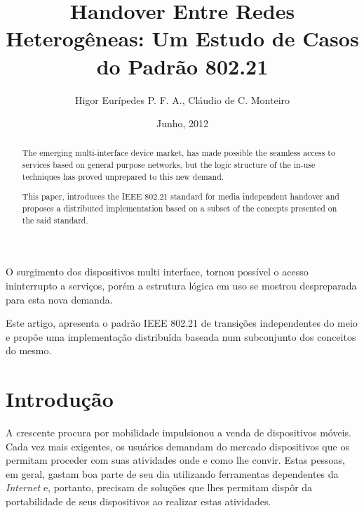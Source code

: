 \documentclass[12pt]{article}
\title{Handover Entre Redes Heterogêneas: Um Estudo de Casos do Padrão 
802.21}
\author{Higor Eurípedes P. F. A.\inst{1}, Cláudio de C. Monteiro\inst{1}}
\date{Junho, 2012}
\begin{document}


\maketitle

\begin{resumo}

O surgimento dos dispositivos multi interface, tornou possível o acesso 
ininterrupto a serviços, porém a estrutura lógica em uso se mostrou 
despreparada para esta nova demanda.

Este artigo, apresenta o padrão IEEE 802.21 de transições independentes do 
meio e propõe uma implementação distribuída baseada num subconjunto dos 
conceitos do mesmo.

\end{resumo}

\begin{abstract}

The emerging multi-interface device market, has made possible the seamless 
access to services based on general purpose networks, but the logic structure 
of the in-use techniques has proved unprepared to this new demand.

This paper, introduces the IEEE 802.21 standard for media independent handover 
and proposes a distributed implementation based on a subset of the concepts 
presented on the said standard.

\end{abstract}


\section{Introdução} \label{sec:introducao} %

A crescente procura por mobilidade impulsionou a venda de dispositivos móveis.  
Cada vez mais exigentes, os usuários demandam do mercado dispositivos que os 
permitam proceder com suas atividades onde e como lhe convir. Estas pessoas, 
em geral, gastam boa parte de seu dia utilizando ferramentas dependentes da 
\textit{Internet} e, portanto, precisam de soluções que lhes permitam dispôr 
da portabilidade de seus dispositivos ao realizar estas atividades.
\end{document}
